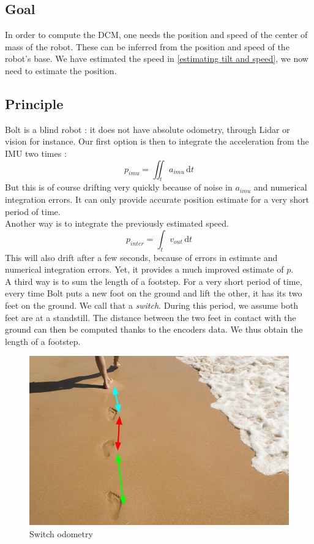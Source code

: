 \documentclass[a4paper,10pt]{article}
\begin{document}
\subsection{Goal}
In order to compute the DCM, one needs the position and speed of the center of mass of the robot. These can be inferred from the position and speed of the robot's base. We have estimated the speed in \ref{estimating tilt and speed}, we now need to estimate the position.

\subsection{Principle}
Bolt is a blind robot : it does not have absolute odometry, through Lidar or vision for instance. Our first option is then to integrate the acceleration from the IMU two times :
$$ p_{imu} = \iint_t a_{imu} \, \mathrm{d}t $$
But this is of course drifting very quickly because of noise in $a_{imu}$ and numerical integration errors. It can only provide accurate position estimate for a very short period of time.\\
\newline
Another way is to integrate the previously estimated speed.
$$ p_{inter} = \int_t v_{out} \, \mathrm{d}t $$
This will also drift after a few seconds, because of errors in estimate and numerical integration errors. Yet, it provides a much improved estimate of $p$.\\
\newline
A third way is to sum the length of a footstep. For a very short period of time, every time Bolt puts a new foot on the ground and lift the other, it has its two feet on the ground. We call that a \textit{switch}. During this period, we assume both feet are at a standstill. The distance between the two feet in contact with the ground can then be computed thanks to the encoders data. We thus obtain the length of a footstep.

\begin{figure}[H]
\label{fig:switch_odometry_principle}
\centering
  \includegraphics[width=\linewidth, angle=0, scale=0.6]{./images/footprint.jpg}
  \caption{Switch odometry}
\end{figure}
\end{document}
